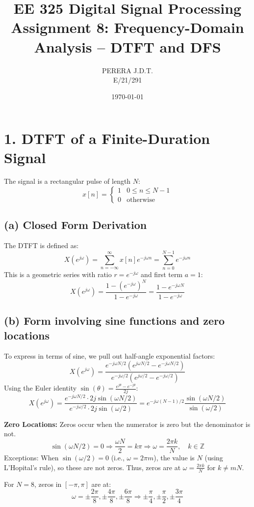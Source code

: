 \documentclass[11pt, a4paper]{article}
\title{EE 325 Digital Signal Processing \\ Assignment 8: Frequency-Domain Analysis – DTFT and DFS}
\author{PERERA J.D.T. \\ E/21/291}
\date{\today}
\begin{document}
\maketitle

\section{1. DTFT of a Finite-Duration Signal}
The signal is a rectangular pulse of length $N$:
$$ x[n] = \begin{cases} 1 & 0 \le n \le N-1 \\ 0 & \text{otherwise} \end{cases} $$

\subsection{(a) Closed Form Derivation}
The DTFT is defined as:
$$ X(e^{j\omega}) = \sum_{n=-\infty}^{\infty} x[n]e^{-j\omega n} = \sum_{n=0}^{N-1} e^{-j\omega n} $$
This is a geometric series with ratio $r = e^{-j\omega}$ and first term $a=1$:
$$ X(e^{j\omega}) = \frac{1 - (e^{-j\omega})^N}{1 - e^{-j\omega}} = \frac{1 - e^{-j\omega N}}{1 - e^{-j\omega}} $$

\subsection{(b) Form involving sine functions and zero locations}
To express in terms of sine, we pull out half-angle exponential factors:
$$ X(e^{j\omega}) = \frac{e^{-j\omega N/2} (e^{j\omega N/2} - e^{-j\omega N/2})}{e^{-j\omega/2} (e^{j\omega/2} - e^{-j\omega/2})} $$
Using the Euler identity $\sin(\theta) = \frac{e^{j\theta} - e^{-j\theta}}{2j}$:
$$ X(e^{j\omega}) = \frac{e^{-j\omega N/2} \cdot 2j \sin(\omega N/2)}{e^{-j\omega/2} \cdot 2j \sin(\omega/2)} = e^{-j\omega(N-1)/2} \frac{\sin(\omega N/2)}{\sin(\omega/2)} $$

\textbf{Zero Locations:}
Zeros occur when the numerator is zero but the denominator is not.
$$ \sin(\omega N/2) = 0 \Rightarrow \frac{\omega N}{2} = k\pi \Rightarrow \omega = \frac{2\pi k}{N}, \quad k \in \mathbb{Z} $$
Exceptions: When $\sin(\omega/2) = 0$ (i.e., $\omega = 2\pi m$), the value is $N$ (using L'Hopital's rule), so these are not zeros.
Thus, zeros are at $\omega = \frac{2\pi k}{N}$ for $k \ne mN$.

For $N=8$, zeros in $[-\pi, \pi]$ are at:
$$ \omega = \pm \frac{2\pi}{8}, \pm \frac{4\pi}{8}, \pm \frac{6\pi}{8} \Rightarrow \pm \frac{\pi}{4}, \pm \frac{\pi}{2}, \pm \frac{3\pi}{4} $$
\end{document}
